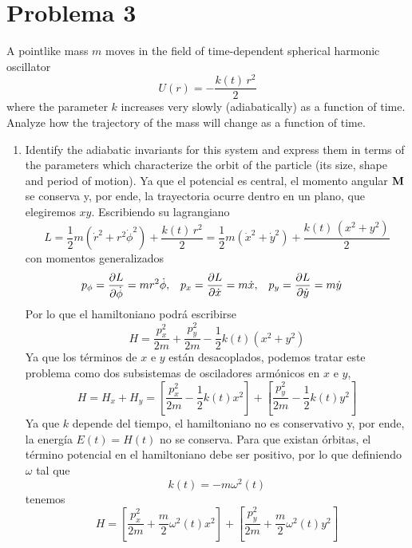 \documentclass[]{article}
\numberwithin{equation}{section}
\begin{document}
\section{Problema 3}
A pointlike mass $m$ moves in the field of time-dependent spherical harmonic oscillator
\begin{equation}
	U(r) = - \frac{k(t) \, r^2}{2}
\end{equation}
where the parameter $k$ increases very slowly (adiabatically) as a function of time. Analyze how the trajectory of the mass will change as a function of time.
\begin{enumerate}
	\item[a.] Identify the adiabatic invariants for this system and express them in terms of the parameters which characterize the orbit of the particle (its size, shape and period of motion).
	\resp Ya que el potencial es central, el momento angular $\mathbf{M}$ se conserva y, por ende, la trayectoria ocurre dentro en un plano, que elegiremos $xy$. Escribiendo su lagrangiano
	\begin{equation}
		L = \frac{1}{2} m \left(\dot{r}^2 + r^2 \dot{\phi}^2\right) + \frac{k(t) \, r^2}{2} = \frac{1}{2} m \left(\dot{x}^2 + \dot{y}^2 \right) + \frac{k(t) \, \left(x^2 + y^2\right)}{2} 
	\end{equation}
	con momentos generalizados
	\begin{align}
		p_\phi &= \dfrac{\partial L}{\partial \dot{\phi}} = m r^2 \dot{\phi}, & p_x &= \dfrac{\partial L}{\partial \dot{x}} = m \dot{x}, & p_y &= \dfrac{\partial L}{\partial \dot{y}} = m \dot{y}
	\end{align}
	Por lo que el hamiltoniano podrá escribirse
	\begin{equation}
		H = \frac{p_x^2}{2m} + \frac{p_y^2}{2m} - \frac{1}{2} k(t) \left(x^2 + y^2\right)
	\end{equation}
	Ya que los términos de $x$ e $y$ están desacoplados, podemos tratar este problema como dos subsistemas de osciladores armónicos en $x$ e $y$,
	\begin{equation}
		H = H_x + H_y = \left[\frac{p_x^2}{2m} - \frac{1}{2} k(t) x^2\right] + \left[\frac{p_y^2}{2m} - \frac{1}{2} k(t) y^2\right]
	\end{equation}
	Ya que $k$ depende del tiempo, el hamiltoniano no es conservativo y, por ende, la energía $E(t) = H(t)$ no se conserva. Para que existan órbitas, el término potencial en el hamiltoniano debe ser positivo, por lo que definiendo $\omega$ tal que
	\begin{equation}
		k(t) = - m \omega^2(t)
	\end{equation}
	tenemos
	\begin{equation}
		H = \left[\frac{p_x^2}{2m} + \frac{m}{2} \omega^2(t) x^2\right] + \left[\frac{p_y^2}{2m} + \frac{m}{2} \omega^2(t) y^2\right]
	\end{equation}
	

\end{enumerate}
\end{document}
